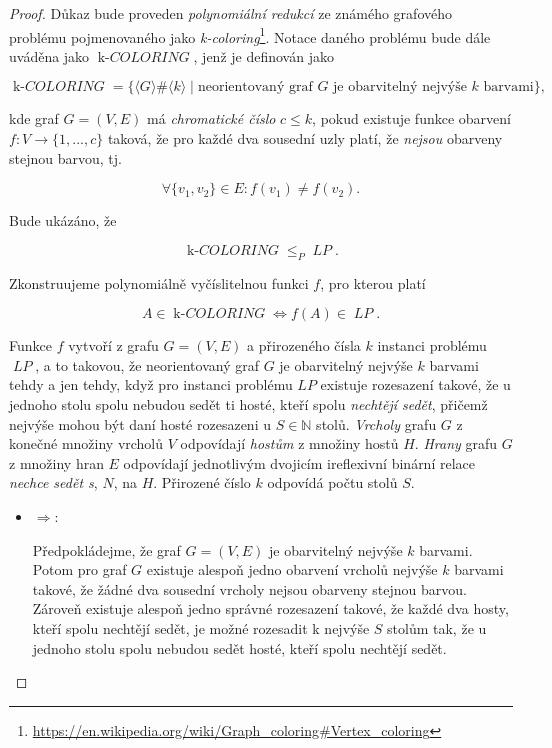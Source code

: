 \documentclass[a4paper, 12pt]{article}
\newcommand\kcoloring{\mathop{\mbox{$k$-$\mathit{COLORING}$}}}
\newcommand\lp{\mathop{\mbox{$\mathit{LP}$}}}
\theoremstyle{definition}
\theoremstyle{definition}
\theoremstyle{definition}
\theoremstyle{remark}
\theoremstyle{remark}
\theoremstyle{remark}
\theoremstyle{remark}
\begin{document}
\begin{proof}
    Důkaz bude proveden \textit{polynomiální redukcí} ze známého grafového problému pojmenovaného jako \textit{k-coloring}\footnote{\url{https://en.wikipedia.org/wiki/Graph_coloring\#Vertex_coloring}}. Notace daného problému bude dále uváděna jako $\kcoloring$, jenž je definován jako 
    
    $$\kcoloring = \{\langle G\rangle\#\langle k\rangle \; | \; \text{neorientovaný graf } G \text{ je obarvitelný nejvýše } k \text{ barvami}\},$$

    \noindent
    kde graf $G = (V, E)$ má \textit{chromatické číslo} $c \leq k$, pokud existuje funkce obarvení $f: V \rightarrow \{1, ..., c\}$ taková, že pro každé dva sousední uzly platí, že \textit{nejsou} obarveny stejnou barvou, tj.
    
    $$\forall \{v_1, v_2\} \in E: f(v_1) \neq f(v_2).$$

    Bude ukázáno, že

    $$\kcoloring \leq_P \lp.$$

    \noindent
    Zkonstruujeme polynomiálně vyčíslitelnou funkci $f$, pro kterou platí

    $$A \in \kcoloring \iff f(A) \in \lp.$$

    Funkce $f$ vytvoří z grafu $G = (V, E)$ a přirozeného čísla $k$ instanci problému $\lp$, a to takovou, že neorientovaný graf $G$ je obarvitelný nejvýše $k$ barvami tehdy a jen tehdy, když pro instanci problému $LP$ existuje rozesazení takové, že u jednoho stolu spolu nebudou sedět ti hosté, kteří spolu \textit{nechtějí sedět}, přičemž nejvýše mohou být daní hosté rozesazeni u $S \in \mathbb{N}$ stolů. \textit{Vrcholy} grafu $G$ z konečné množiny vrcholů $V$ odpovídají \textit{hostům} z množiny hostů $H$. \textit{Hrany} grafu $G$ z množiny hran $E$ odpovídají jednotlivým dvojicím ireflexivní binární relace \textit{nechce sedět s}, $N$, na $H$. Přirozené číslo $k$ odpovídá počtu stolů $S$.

    \begin{itemize}
        \item $\Rightarrow$:

        Předpokládejme, že graf $G = (V, E)$ je obarvitelný nejvýše $k$ barvami. Potom pro graf $G$ existuje alespoň jedno obarvení vrcholů nejvýše $k$ barvami takové, že žádné dva sousední vrcholy nejsou obarveny stejnou barvou. Zároveň existuje alespoň jedno správné rozesazení takové, že každé dva hosty, kteří spolu nechtějí sedět, je možné rozesadit k nejvýše $S$ stolům tak, že u jednoho stolu spolu nebudou sedět hosté, kteří spolu nechtějí sedět.
        

\end{itemize}
\end{proof}
\end{document}
